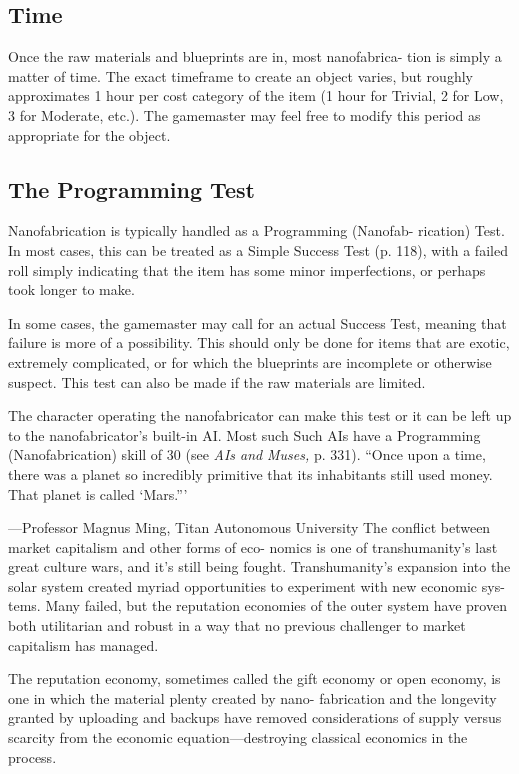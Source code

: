 \subsection{Time}

Once the raw materials and blueprints are in, most nanofabrica-
tion is simply a matter of time. The exact timeframe to create an 
object varies, but roughly approximates 1 hour per cost category of 
the item (1 hour for Trivial, 2 for Low, 3 for Moderate, etc.). The 
gamemaster may feel free to modify this period as appropriate for 
the object.

\subsection{The Programming Test}

Nanofabrication is typically handled as a Programming (Nanofab-
rication) Test. In most cases, this can be treated as a Simple Success 
Test (p. 118), with a failed roll simply indicating that the item has 
some minor imperfections, or perhaps took longer to make.

In some cases, the gamemaster may call for an actual Success Test, 
meaning that failure is more of a possibility. This should only be 
done for items that are exotic, extremely complicated, or for which 
the blueprints are incomplete or otherwise suspect. This test can also 
be made if the raw materials are limited.

The character operating the nanofabricator can make this test or 
it can be left up to the nanofabricator's built-in AI. Most such Such 
AIs have a Programming (Nanofabrication) skill of 30 (see \textit{AIs and }
\textit{Muses,} p. 331).
``Once upon a time, there was a planet so incredibly primitive that its 
inhabitants still used money. That planet is called ‘Mars.'''

—Professor Magnus Ming, Titan Autonomous University
The conflict between market capitalism and other forms of eco-
nomics is one of transhumanity's last great culture wars, and it's 
still being fought. Transhumanity's expansion into the solar system 
created myriad opportunities to experiment with new economic sys-
tems. Many failed, but the reputation economies of the outer system 
have proven both utilitarian and robust in a way that no previous 
challenger to market capitalism has managed.

The reputation economy, sometimes called the gift economy or 
open economy, is one in which the material plenty created by nano-
fabrication and the longevity granted by uploading and backups 
have removed considerations of supply versus scarcity from the 
economic equation—destroying classical economics in the process.

